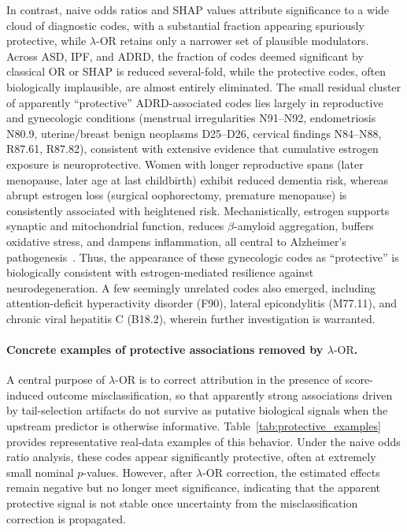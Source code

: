 \documentclass[pdflatex,sn-mathphys-num]{sn-jnl}%
\newcommand{\SPOR}{\textrm{$\lambda$-OR}}
\theoremstyle{thmstyleone}%
\theoremstyle{thmstyletwo}%
\theoremstyle{thmstylethree}%
\begin{document}
In contrast, naive odds ratios and SHAP values attribute significance to a wide cloud of diagnostic codes, with a substantial fraction appearing spuriously protective, while $\SPOR$ retains only a narrower set of plausible modulators. Across ASD, IPF, and ADRD, the fraction of codes deemed significant by classical OR or SHAP is reduced several-fold, while the protective codes, often biologically implausible, are almost entirely eliminated. The small residual cluster of apparently ``protective'' ADRD-associated codes lies largely in reproductive and gynecologic conditions (menstrual irregularities N91--N92, endometriosis N80.9, uterine/breast benign neoplasms D25--D26, cervical findings N84--N88, R87.61, R87.82), consistent with extensive evidence that cumulative estrogen exposure is neuroprotective. Women with longer reproductive spans (later menopause, later age at last childbirth) exhibit reduced dementia risk, whereas abrupt estrogen loss (surgical oophorectomy, premature menopause) is consistently associated with heightened risk. Mechanistically, estrogen supports synaptic and mitochondrial function, reduces $\beta$-amyloid aggregation, buffers oxidative stress, and dampens inflammation, all central to Alzheimer’s pathogenesis~\cite{zarate2017role,Georgakis2016}. Thus, the appearance of these gynecologic codes as ``protective'' is biologically consistent with estrogen-mediated resilience against neurodegeneration. A few seemingly unrelated codes also emerged, including attention-deficit hyperactivity disorder (F90), lateral epicondylitis (M77.11), and chronic viral hepatitis C (B18.2), wherein further investigation is warranted.

\paragraph{Concrete examples of protective associations removed by \texorpdfstring{$\SPOR$}{SPOR}.}
A central purpose of $\SPOR$ is to correct attribution in the presence of score-induced outcome misclassification, so that apparently strong associations driven by tail-selection artifacts do not survive as putative biological signals when the upstream predictor is otherwise informative. Table~\ref{tab:protective_examples} provides representative real-data examples of this behavior. Under the naive odds ratio analysis, these codes appear significantly protective, often at extremely small nominal $p$-values. However, after $\SPOR$ correction, the estimated effects remain negative but no longer meet significance, indicating that the apparent protective signal is not stable once uncertainty from the misclassification correction is propagated.
\end{document}
